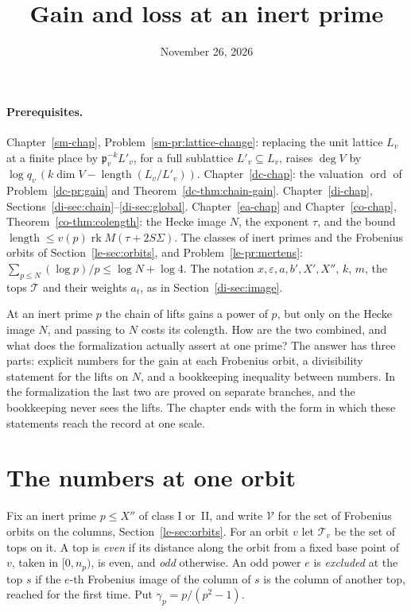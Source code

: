 \documentclass[reqno]{amsart}
\title{Gain and loss at an inert prime}
\author{}
\date{November 26, 2026}
\newcounter{chap}
\theoremstyle{definition}
\theoremstyle{plain}
\theoremstyle{remark}
\newcommand{\Tc}{\mathcal T}
\newcommand{\Vc}{\mathcal V}
\newcommand{\rk}{\operatorname{rk}}
\newcommand{\len}{\operatorname{length}}
\newcommand{\ord}{\operatorname{ord}}
\begin{document}
\maketitle
{}\label{chap}

\paragraph{Prerequisites.}
Chapter~\ref{sm-chap}, Problem~\ref{sm-pr:lattice-change}: replacing the unit lattice \(L_v\) at a finite place by \(\mathfrak p_v^{-k}L'_v\), for a full sublattice \(L'_v\subseteq L_v\), raises \(\deg V\) by \(\log q_v\,(k\dim V-\len(L_v/L'_v))\).  Chapter~\ref{dc-chap}: the valuation \(\ord\) of Problem~\ref{dc-pr:gain} and Theorem~\ref{dc-thm:chain-gain}.  Chapter~\ref{di-chap}, Sections~\ref{di-sec:chain}--\ref{di-sec:global}.  Chapter~\ref{ea-chap} and Chapter~\ref{co-chap}, Theorem~\ref{co-thm:colength}: the Hecke image \(N\), the exponent \(\tau\), and the bound \(\len\le v(p)\rk M(\tau+2S\Sigma)\).  The classes of inert primes and the Frobenius orbits of Section~\ref{le-sec:orbits}, and Problem~\ref{le-pr:mertens}: \(\sum_{p\le N}(\log p)/p\le\log N+\log4\).  The notation \(x,\varepsilon,a,b',X',X''\), \(k\), \(m\), the tops \(\Tc\) and their weights \(a_t\), as in Section~\ref{di-sec:image}.

At an inert prime \(p\) the chain of lifts gains a power of \(p\), but only on the Hecke image \(N\), and passing to \(N\) costs its colength.  How are the two combined, and what does the formalization \cite{Lean} actually assert at one prime?  The answer has three parts: explicit numbers for the gain at each Frobenius orbit, a divisibility statement for the lifts on \(N\), and a bookkeeping inequality between numbers.  In the formalization the last two are proved on separate branches, and the bookkeeping never sees the lifts.  The chapter ends with the form in which these statements reach the record at one scale.

\section{The numbers at one orbit}\label{sec:numbers}

Fix an inert prime \(p\le X''\) of class I or~II, and write \(\Vc\) for the set of Frobenius orbits on the columns, Section~\ref{le-sec:orbits}.  For an orbit \(v\) let \(\Tc_v\) be the set of tops on it.  A top is \emph{even} if its distance along the orbit from a fixed base point of \(v\), taken in \([0,n_p)\), is even, and \emph{odd} otherwise.  An odd power \(e\) is \emph{excluded} at the top \(s\) if the \(e\)-th Frobenius image of the column of \(s\) is the column of another top, reached for the first time.  Put \(\gamma_p=p/(p^2-1)\).
\end{document}
